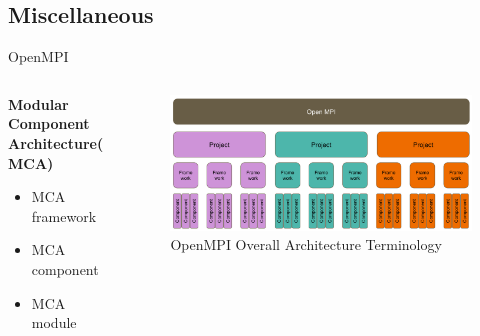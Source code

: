 \subsection{Miscellaneous}

\begin{frame}{OpenMPI}
\begin{columns}
    \begin{column}{.5 \textwidth}

    \textbf{\large Modular Component Architecture(MCA)}

    \begin{itemize}
        \item MCA framework
        \item MCA component
        \item MCA module
    \end{itemize}
            
    \end{column}

    \begin{column}{.5 \textwidth}
        \begin{figure}
            \centering
            \includegraphics[width=1\linewidth]{day8_am/img/mpi/ompi_arch.png}
            \caption{OpenMPI Overall Architecture Terminology}
            \label{fig:ompi_arch}
        \end{figure}
    \end{column}    
\end{columns}
\end{frame}

